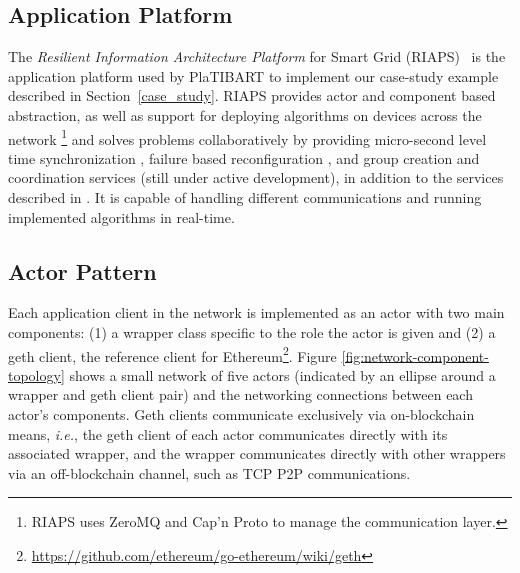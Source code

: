 \subsection{Application Platform}


The \textit{Resilient Information Architecture Platform} for Smart Grid (RIAPS)~\cite{RIAPS_IEEE_ISORC_2017} is the application platform used by PlaTIBART to implement our case-study example described in Section~\ref{case_study}. %
RIAPS provides actor and component based abstraction, as well as support for deploying algorithms on devices across the network \footnote{RIAPS uses ZeroMQ \cite{hintjens2010zeromq} and Cap'n Proto \cite{varda2015cap} to manage the communication layer.} and solves problems collaboratively by providing micro-second level time synchronization \cite{RIAPS_IEEE_ISORC_2017}, failure based reconfiguration \cite{dubey2017resilience}, and group creation and coordination services (still under active development), in addition to the services described in \cite{LeeNiddodiSrivastavaBakken2016}. It is capable of handling different communications and running implemented algorithms in real-time.

\subsection{Actor Pattern}
Each application client in the network is implemented as an actor with two main components: (1) a wrapper class specific to the role the actor is given and (2) a geth client, the  reference client for Ethereum\footnote{\url{https://github.com/ethereum/go-ethereum/wiki/geth}}. Figure \ref{fig:network-component-topology} shows a small network of five actors (indicated by an ellipse around a wrapper and geth client pair) and the networking connections between each actor's components. Geth clients communicate exclusively via on-blockchain means,\textit{ i.e.}, the geth client of each actor communicates directly with its associated wrapper, and the wrapper  communicates directly with other wrappers via an off-blockchain channel, such as TCP P2P communications. 


